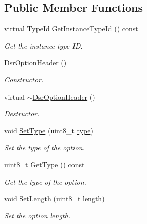 \subsection*{Public Member Functions}
\begin{DoxyCompactItemize}
\item 
virtual \hyperlink{classns3_1_1TypeId}{Type\+Id} \hyperlink{classns3_1_1dsr_1_1DsrOptionHeader_a3ef331aa6a32b1a83d2b4bd4b4396e4a}{Get\+Instance\+Type\+Id} () const 
\begin{DoxyCompactList}\small\item\em Get the instance type ID. \end{DoxyCompactList}\item 
\hyperlink{classns3_1_1dsr_1_1DsrOptionHeader_ab9aff7826da8ec91dbb9dbb7906a00a7}{Dsr\+Option\+Header} ()
\begin{DoxyCompactList}\small\item\em Constructor. \end{DoxyCompactList}\item 
virtual \hyperlink{classns3_1_1dsr_1_1DsrOptionHeader_a3a12f112baf16670db2844a40fc96a24}{$\sim$\+Dsr\+Option\+Header} ()
\begin{DoxyCompactList}\small\item\em Destructor. \end{DoxyCompactList}\item 
void \hyperlink{classns3_1_1dsr_1_1DsrOptionHeader_a62b3733f99509fd870ff3ebc9d4513e4}{Set\+Type} (uint8\+\_\+t \hyperlink{visualizer-ideas_8txt_add98db9e15e2a58cf2b57623e7aa893a}{type})
\begin{DoxyCompactList}\small\item\em Set the type of the option. \end{DoxyCompactList}\item 
uint8\+\_\+t \hyperlink{classns3_1_1dsr_1_1DsrOptionHeader_a1f45f05b6f07be23f84dfd90fca2519f}{Get\+Type} () const 
\begin{DoxyCompactList}\small\item\em Get the type of the option. \end{DoxyCompactList}\item 
void \hyperlink{classns3_1_1dsr_1_1DsrOptionHeader_ac13ae881ef80b4c2fce6d59f8aa0fa3e}{Set\+Length} (uint8\+\_\+t length)
\begin{DoxyCompactList}\small\item\em Set the option length. \end{DoxyCompactList}\item 

\end{DoxyCompactItemize}
